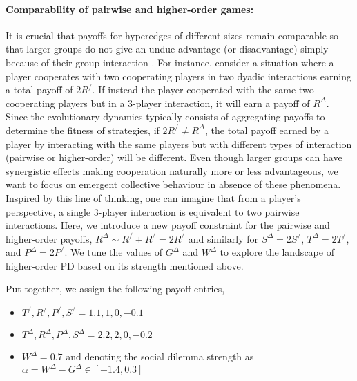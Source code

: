 \documentclass[a4paper,pre,reqno,superscriptaddress,twocolumn, floatfix]{revtex4}
\begin{document}
\vspace{1em}
\paragraph*{Comparability of pairwise and higher-order games:} 

It is crucial that payoffs for hyperedges of different sizes remain comparable so that larger groups do not give an undue advantage (or disadvantage) simply because of their group interaction \cite{capraro_group_2015, pena_group_2018, pereda_group_2019, wang_evolutionary_2024}. For instance, consider a situation where a player cooperates with two cooperating players in two dyadic interactions earning a total payoff of $2R^/$. If instead the player cooperated with the same two cooperating players but in a 3-player interaction, it will earn a payoff of $R^{\Delta}$. Since the evolutionary dynamics typically consists of aggregating payoffs to determine the fitness of strategies, if $2 R^/ \neq R^{\Delta}$, the total payoff earned by a player by interacting with the same players but with different types of interaction (pairwise or higher-order) will be different. Even though larger groups can have synergistic effects \cite{ capraro_group_2015, pena_group_2018, pereda_group_2019, lee_group-size_2023} making cooperation naturally more or less advantageous, we want to focus on emergent collective behaviour in absence of these phenomena. Inspired by this line of thinking, one can imagine that from a player's perspective, a single 3-player interaction is equivalent to two pairwise interactions.
%
Here, we introduce a new payoff constraint for the pairwise and higher-order payoffs, $R^{\Delta} \sim R^/ + R^/ = 2 R^/$ and similarly for $S^{\Delta} = 2 S^/$, $T^{\Delta} = 2 T^/$, and $P^{\Delta} = 2 P^/$. We tune the values of $G^{\Delta}$ and $W^{\Delta}$ to explore the landscape of higher-order PD based on its strength mentioned above.


Put together, we assign the following payoff entries,
\begin{itemize}
    \item $T^/, R^/, P^/, S^/ = 1.1, 1, 0, -0.1$
    \item $T^{\Delta}, R^{\Delta}, P^{\Delta}, S^{\Delta} = 2.2, 2, 0, -0.2$
    \item $W^{\Delta}=0.7$ and denoting the social dilemma strength as $\alpha = W^{\Delta}-G^{\Delta} \in [-1.4, 0.3]$
\end{itemize}
\end{document}
